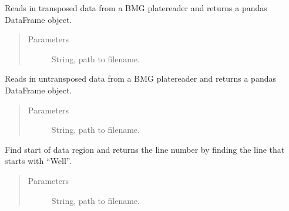 \documentclass[letterpaper,10pt,english]{sphinxmanual}
\begin{document}

\begin{fulllineitems}
\label{\detokenize{platelib:platelib.plateread.read_transposed_bmg}}
Reads in transposed data from a BMG platereader and returns a pandas DataFrame object.
\begin{quote}\begin{description}
\item[{Parameters}] \leavevmode
{} \textendash{} String, path to filename.

\end{description}\end{quote}

\end{fulllineitems}


\begin{fulllineitems}
\label{\detokenize{platelib:platelib.plateread.read_untransposed_bmg}}
Reads in untransposed data from a BMG platereader and returns a pandas DataFrame object.
\begin{quote}\begin{description}
\item[{Parameters}] \leavevmode
{} \textendash{} String, path to filename.

\end{description}\end{quote}

\end{fulllineitems}


\begin{fulllineitems}
\label{\detokenize{platelib:platelib.plateread.search_start}}
Find start of data region and returns the line number by finding the line that starts with “Well”.
\begin{quote}\begin{description}
\item[{Parameters}] \leavevmode
{} \textendash{} String, path to filename.

\end{description}\end{quote}

\end{fulllineitems}
\end{document}
